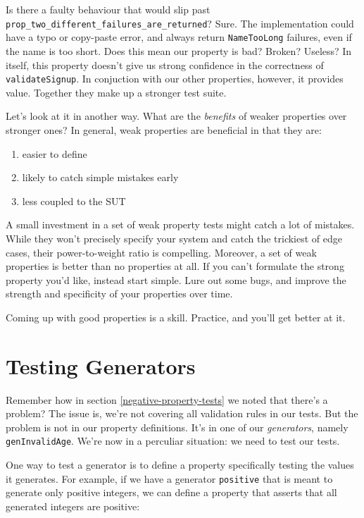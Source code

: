 Is there a faulty behaviour that would slip past
\texttt{prop\_two\_different\_failures\_are\_returned}? Sure. The
implementation could have a typo or copy-paste error, and always return
\texttt{NameTooLong} failures, even if the name is too short. Does this
mean our property is bad? Broken? Useless? 
In itself, this property doesn't give us strong confidence in the
correctness of \texttt{validateSignup}. In conjuction with our other
properties, however, it provides value. Together they make up a stronger
test suite.

Let's look at it in another way. What are the \emph{benefits} of weaker
properties over stronger ones? In general, weak properties are
beneficial in that they are:

\begin{enumerate}
\item
  easier to define
\item
  likely to catch simple mistakes early
\item
  less coupled to the SUT
\end{enumerate}
A small investment in a set of weak property tests might catch a lot of
mistakes. While they won't precisely specify your system and catch the
trickiest of edge cases, their power-to-weight ratio is compelling.
Moreover, a set of weak properties is better than no properties at all.
If you can't formulate the strong property you'd like, instead start
simple. Lure out some bugs, and improve the strength and specificity of
your properties over time.

Coming up with good properties is a skill. Practice, and you'll get
better at it.

\section{Testing Generators}\label{testing-generators}

Remember how in section 
\ref{negative-property-tests} we noted that there's a problem? The issue is, we're not
covering all validation rules in our tests. But the problem is not in
our property definitions. It's in one of our \emph{generators}, namely
\texttt{genInvalidAge}. We're now in a perculiar situation: we need to
test our tests.

One way to test a generator is to define a property specifically testing
the values it generates. For example, if we have a generator
\texttt{positive} that is meant to generate only positive integers, we
can define a property that asserts that all generated integers are
positive:

